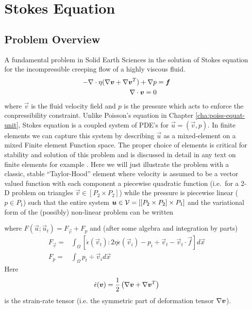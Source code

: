 \chapter{Stokes Equation}
\label{cha:stokes-equation}

\section{Problem Overview}
\label{sec:problem-formulation}

A fundamental problem in Solid Earth Sciences in the solution of
Stokes equation for the incompressible creeping flow of a highly
viscous fluid.
\begin{align}
-\nabla\cdot\eta(\nabla{\mbox{\boldmath$v$}} + \nabla{\mbox{\boldmath$v$}}^{T}) + \nabla p &= {\mbox{\boldmath$f$}}\\ 
\nabla\cdot {\mbox{\boldmath$v$}} = 0 & 
\end{align}
where $\vec{v}$ is the fluid velocity field and $p$ is the pressure
which acts to enforce the conpressibility constraint.  Unlike
Poisson's equation in Chapter \ref{cha:poiss-equat-unit},  Stokes
equation is a coupled system of PDE's for $\vec{u} = (\vec{v},p)$. In
finite elements we can capture this system by describing $\vec{u}$ as
a mixed-element on a mixed Finite element Function space.  The proper
choice of elements is critical for stability and solution of this
problem and is discussed in detail in any text on finite elements
for example \cite{elman_finite_2005}.   Here we will just illustrate the
problem with a classic, stable ``Taylor-Hood'' element where velocity
is assumed to be a vector valued function with each component a
piecewise quadratic function (i.e.\ for a 2-D problem on triangles
$\vec{v}\in [P_{2}\times P_{2}]$) while the pressure is piecewise
linear ($p\in P_{1}$) such that the entire system ${\mbox{\boldmath$u$}}\in \mathcal{V}
= [[P_{2}\times P_{2}]\times P_{1}]$ and the variational form of the
(possibly) non-linear problem can be written 
\begin{quote}
\end{quote}
 where $F(\vec{u};\vec{u}_{t}) = F_{\vec{v}} + F_{p}$ and (after some
 algebra and integration by parts)
\begin{align}
         F_{\vec{v}} =  & \int_\Omega \left[\dot{\epsilon}(\vec{v}_{t}):
             2\eta \dot{\epsilon}(\vec{v}_{i}) -
             p_{i}\div\vec{v}_t  - \vec{v}_{t} \cdot\vec{f} \right]d\vec{x}  \\
 F_{p} =& \int_\Omega p_t\div\vec{v}_{i} d\vec{x}
\end{align}
Here
\begin{equation}
  \label{eq:19}
  \dot{\epsilon}({\mbox{\boldmath$v$}}) = \frac{1}{2}
  \left(
\nabla{\mbox{\boldmath$v$}} + \nabla{\mbox{\boldmath$v$}}^{T}
  \right)
\end{equation} is the strain-rate tensor (i.e. the symmetric part of
deformation tensor $\nabla{\mbox{\boldmath$v$}}$).   

